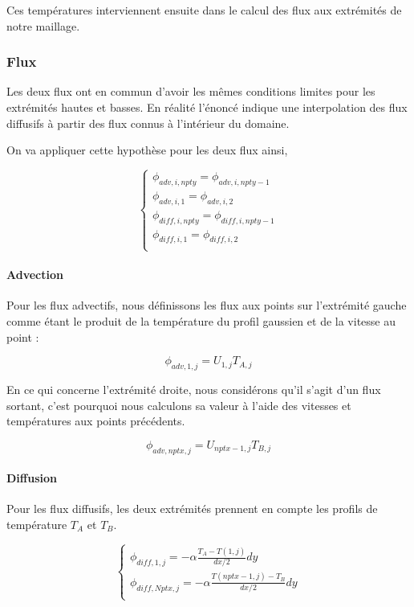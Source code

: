 \documentclass[a4paper,oneside]{article}
\begin{document}
Ces températures interviennent ensuite dans le calcul des flux aux extrémités de notre maillage.

\subsubsection{Flux}

Les deux flux ont en commun d'avoir les mêmes conditions limites pour les extrémités hautes et basses.
En réalité l'énoncé indique une interpolation des flux diffusifs à partir des flux connus à l'intérieur du domaine.

On va appliquer cette hypothèse pour les deux flux ainsi, 

\begin{equation*}
	\begin{cases}
		
	\phi_{adv,i,npty} = \phi_{adv,i,npty-1}\\
	\phi_{adv,i,1} = \phi_{adv,i,2}\\
	\phi_{diff,i,npty} = \phi_{diff,i,npty-1}\\
	\phi_{diff,i,1} = \phi_{diff,i,2}\\
	\end{cases}
\end{equation*}

\paragraph{Advection}
Pour les flux advectifs, nous définissons les flux aux points sur l'extrémité gauche comme étant le produit de la température du profil gaussien et de la vitesse au point :

\[
 \phi_{adv,1,j} =U_{1,j}T_{A,j}
\]


En ce qui concerne l'extrémité droite, nous considérons qu'il s'agit d'un flux sortant, c'est pourquoi nous calculons sa valeur à l'aide des vitesses et températures aux points précédents.
  
\[
 \phi_{adv,nptx,j} =U_{nptx-1,j}T_{B,j}
\]  


\paragraph{Diffusion}


Pour les flux diffusifs, les deux extrémités prennent en compte les profils de température $T_A$ et $T_B$.

\begin{equation*}
	\begin{cases}
		\phi_{diff,1,j} = -\alpha\frac{T_A - T(1,j)}{dx/2} dy\\
		\phi_{diff,Nptx,j} = -\alpha\frac{T(nptx-1,j) -T_B }{dx/2} dy\\
	\end{cases}
\end{equation*}
 
\end{document}
